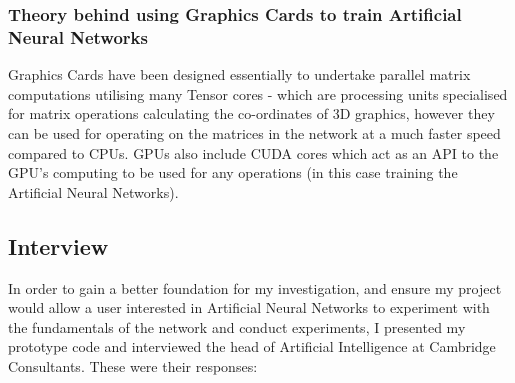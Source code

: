\documentclass[./project-report/src/latex/project-report.tex]{subfiles}
\begin{document}
\subsubsection{Theory behind using Graphics Cards to train Artificial Neural Networks}
\vspace{5mm}

Graphics Cards have been designed essentially to undertake parallel matrix computations utilising many Tensor cores - which are processing units specialised for matrix operations 
calculating the co-ordinates of 3D graphics, however they can be used for operating on the matrices in the network at a much faster speed compared to CPUs. GPUs also include CUDA 
cores which act as an API to the GPU's computing to be used for any operations (in this case training the Artificial Neural Networks).

\subsection{Interview}

In order to gain a better foundation for my investigation, and ensure my project would allow a user interested in Artificial Neural Networks to experiment with the 
fundamentals of the network and conduct experiments, I presented my prototype code and interviewed the head of Artificial Intelligence at Cambridge Consultants. 
These were their responses:
\end{document}
